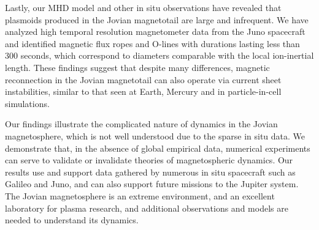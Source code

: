 Lastly, our MHD model and other in situ observations have revealed that plasmoids produced in the Jovian magnetotail are large and infrequent. We have analyzed high temporal resolution magnetometer data from the Juno spacecraft and identified magnetic flux ropes and O-lines with durations lasting less than 300 seconds, which correspond to diameters comparable with the local ion-inertial length. These findings suggest that despite many differences, magnetic reconnection in the Jovian magnetotail can also operate via current sheet instabilities, similar to that seen at Earth, Mercury and in particle-in-cell simulations.

Our findings illustrate the complicated nature of dynamics in the Jovian magnetosphere, which is not well understood due to the sparse in situ data. We demonstrate that, in the absence of global empirical data, numerical experiments can serve to validate or invalidate theories of magnetospheric dynamics. Our results use and support data gathered by numerous in situ spacecraft such as Galileo and Juno, and can also support future missions to the Jupiter system. The Jovian magnetosphere is an extreme environment, and an excellent laboratory for plasma research, and additional observations and models are needed to understand its dynamics. 


